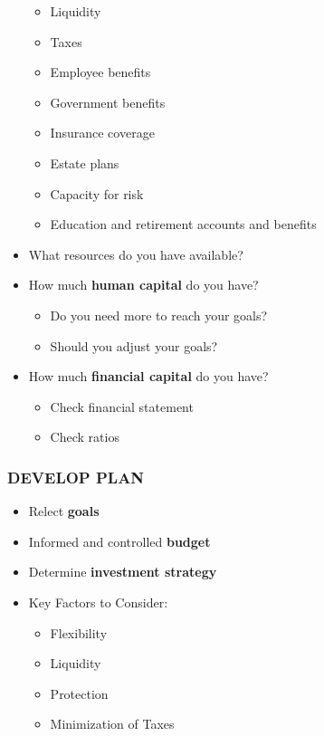\documentclass[12pt]{article}
\begin{document}
\begin{itemize}
\begin{itemize}
                            \item Liquidity
                            \item Taxes
                            \item Employee benefits
                            \item Government benefits
                            \item Insurance coverage
                            \item Estate plans
                            \item Capacity for risk
                            \item Education and retirement accounts and benefits
                        \end{itemize}
                    \item What resources do you have available?
                    \item How much \textbf{human capital} do you have?
                        \begin{itemize}
                            \item Do you need more to reach your goals?
                            \item Should you adjust your goals?
                        \end{itemize}
                    \item How much \textbf{financial capital} do you have?
                        \begin{itemize}
                            \item Check financial statement
                            \item Check ratios
                        \end{itemize}       
                \end{itemize}

            \subsubsection{DEVELOP PLAN}
                \begin{itemize}
                    \item Relect \textbf{goals}
                    \item Informed and controlled \textbf{budget}
                    \item Determine \textbf{investment strategy}
                    \item Key Factors to Consider:
                        \begin{itemize}
                            \item Flexibility
                            \item Liquidity
                            \item Protection
                            \item Minimization of Taxes
                        \end{itemize}
                \end{itemize}
\end{document}
